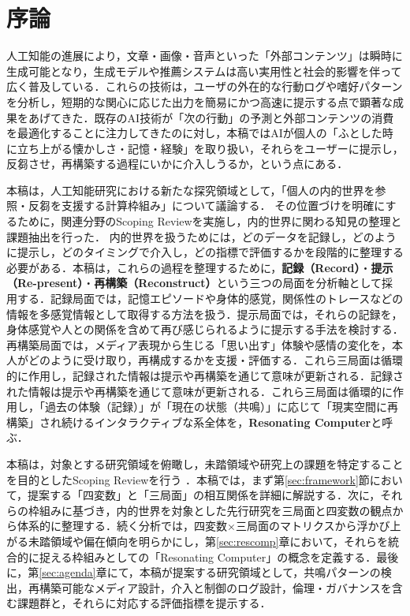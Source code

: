 \documentclass[originalpaper]{jsaiart}
\author{%
 \name{清水}{紘輔}{Kosuke Shimizu}
 \affiliation{筑波大学 情報学群 情報メディア創成学類}%
     {College of Media Arts, Science and Technology, University of Tsukuba}%
     {shimizu@ai.iit.tsukuba.ac.jp}
}
\begin{document}
\maketitle

\section{序論}
人工知能の進展により，文章・画像・音声といった「外部コンテンツ」は瞬時に生成可能となり，生成モデルや推薦システムは高い実用性と社会的影響を伴って広く普及している．これらの技術は，ユーザの外在的な行動ログや嗜好パターンを分析し，短期的な関心に応じた出力を簡易にかつ高速に提示する点で顕著な成果をあげてきた\cite{igarashi2025}．既存のAI技術が「次の行動」の予測と外部コンテンツの消費を最適化することに注力してきたのに対し，本稿ではAIが個人の「ふとした時に立ち上がる懐かしさ・記憶・経験\cite{JUHL2023101545,Becker2024Routledge}」を取り扱い，それらをユーザーに提示し，反芻させ，再構築する過程にいかに介入しうるか，という点にある．

本稿は，人工知能研究における新たな探究領域として，「個人の内的世界を参照・反芻を支援する計算枠組み」について議論する．
その位置づけを明確にするために，関連分野のScoping Review\cite{arksey2005,levac2010}を実施し，内的世界に関わる知見の整理と課題抽出を行った．
内的世界を扱うためには，どのデータを記録し，どのように提示し，どのタイミングで介入し，どの指標で評価するかを段階的に整理する必要がある．本稿は，これらの過程を整理するために，\textbf{記録（Record）}・\textbf{提示（Re-present）}・\textbf{再構築（Reconstruct）}という三つの局面を分析軸として採用する．記録局面では，記憶エピソードや身体的感覚，関係性のトレースなどの情報を多感覚情報として取得する方法を扱う．提示局面では，それらの記録を，身体感覚や人との関係を含めて再び感じられるように提示する手法を検討する．再構築局面では，メディア表現から生じる「思い出す」体験や感情の変化を，本人がどのように受け取り，再構成するかを支援・評価する．これら三局面は循環的に作用し，記録された情報は提示や再構築を通じて意味が更新される．記録された情報は提示や再構築を通じて意味が更新される．これら三局面は循環的に作用し，「過去の体験（記録）」が「現在の状態（共鳴）」に応じて「現実空間に再構築」され続けるインタラクティブな系全体を，\textbf{Resonating Computer}と呼ぶ．

本稿は，対象とする研究領域を俯瞰し，未踏領域や研究上の課題を特定することを目的としたScoping Reviewを行う \cite{arksey2005,levac2010}．本稿では，まず第\ref{sec:framework}節において，提案する「四変数」と「三局面」の相互関係を詳細に解説する．次に，それらの枠組みに基づき，内的世界を対象とした先行研究を三局面と四変数の観点から体系的に整理する．続く分析では，四変数×三局面のマトリクスから浮かび上がる未踏領域や偏在傾向を明らかにし，第\ref{sec:rescomp}章において，それらを統合的に捉える枠組みとしての「Resonating Computer」の概念を定義する．最後に，第\ref{sec:agenda}章にて，本稿が提案する研究領域として，共鳴パターンの検出，再構築可能なメディア設計，介入と制御のログ設計，倫理・ガバナンスを含む課題群と，それらに対応する評価指標を提示する．
\end{document}
